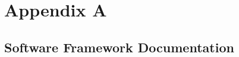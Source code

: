 \chapter{Appendix A}
\section{Software Framework Documentation}\label{sec:FrameworkDoc}

\lipsum[1-2]


%
